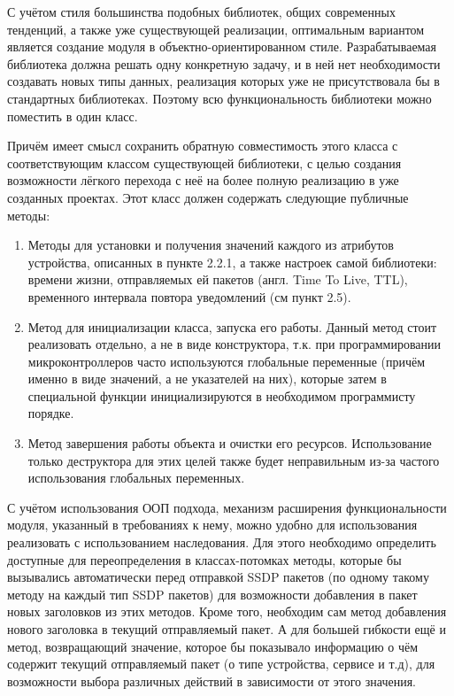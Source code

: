 С учётом стиля большинства подобных библиотек, общих современных тенденций, а также уже существующей реализации, оптимальным вариантом является создание модуля в объектно-ориентированном стиле.
Разрабатываемая библиотека должна решать одну конкретную задачу, и в ней нет необходимости создавать новых типы данных, реализация которых уже не присутствовала бы в стандартных библиотеках.
Поэтому всю функциональность библиотеки можно поместить в один класс.

Причём имеет смысл сохранить обратную совместимость этого класса с соответствующим классом существующей библиотеки, с целью создания возможности лёгкого перехода с неё на более полную реализацию в уже созданных проектах.
Этот класс должен содержать следующие публичные методы:

\begin{enumerate}
	\item Методы для установки и получения значений каждого из атрибутов устройства, описанных в пункте 2.2.1, а также настроек самой библиотеки: времени жизни, отправляемых ей пакетов (англ. Time To Live, TTL), временного интервала повтора уведомлений (см пункт 2.5).
	\item Метод для инициализации класса, запуска его работы.
	Данный метод стоит реализовать отдельно, а не в виде конструктора, т.к. при программировании микроконтроллеров часто используются глобальные переменные (причём именно в виде значений, а не указателей на них), которые затем в специальной функции инициализируются в необходимом программисту порядке.
	\item Метод завершения работы объекта и очистки его ресурсов.
	Использование только деструктора для этих целей также будет неправильным из-за частого использования глобальных переменных.
\end{enumerate}

С учётом использования ООП подхода, механизм расширения функциональности модуля, указанный в требованиях к нему, можно удобно для использования реализовать с использованием наследования.
Для этого необходимо определить доступные для переопределения в классах-потомках методы, которые бы вызывались автоматически перед отправкой SSDP пакетов (по одному такому методу на каждый тип SSDP пакетов) для возможности добавления в пакет новых заголовков из этих методов.
Кроме того, необходим сам метод добавления нового заголовка в текущий отправляемый пакет.
А для большей гибкости ещё и метод, возвращающий значение, которое бы показывало информацию о чём содержит текущий отправляемый пакет (о типе устройства, сервисе и т.д), для возможности выбора различных действий в зависимости от этого значения.

